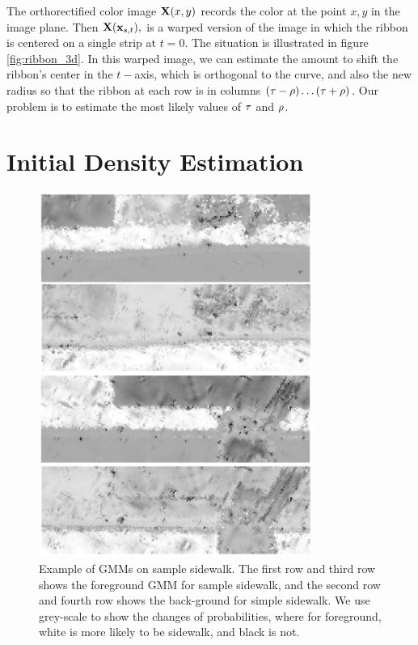 The orthorectified color image $\mathbf{X}(x,y)$ records the color at the point $x,y$ in the image
plane. Then $\mathbf{X}(\mathbf{x}_{s,t}),$ is a warped version of the image in which the ribbon is
centered on a single strip at $t=0$. The situation is illustrated in figure  \ref{fig:ribbon_3d}. In
this warped image, we can estimate the amount \OutputTrajectory{} to shift the ribbon's center in
the $t-$axis, which is orthogonal to the curve,  and also the new radius \OutputRadius{} so
that the  ribbon at each row is in columns $(\tau{} -\rho{}
)\dots(\tau{}+\rho{})$. Our problem is to estimate the most likely values of
$\tau{}$ and $\rho{}$.


\section{Initial Density Estimation}

\begin{figure}[H]
    \centering
    \includegraphics[width=0.8\textwidth]{Figures/gmm_sample_1.png}
    \caption[\ac{GMM} Result 1]{Example of GMMs on sample sidewalk. The first row and third row shows the foreground GMM for sample sidewalk, and the second row and fourth row shows the back-ground for simple sidewalk. We use grey-scale to show the changes of probabilities, where for foreground, white is more likely to be sidewalk, and black is not.}
    \label{fig:GMM_result}
\end{figure}



